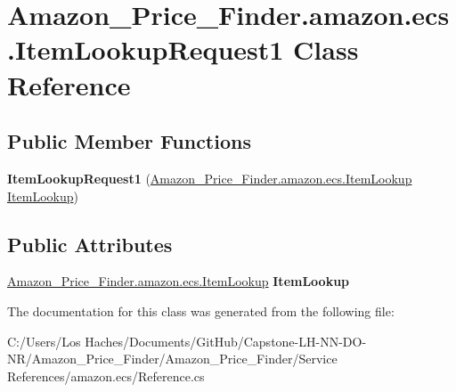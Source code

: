 \hypertarget{class_amazon___price___finder_1_1amazon_1_1ecs_1_1_item_lookup_request1}{\section{Amazon\-\_\-\-Price\-\_\-\-Finder.\-amazon.\-ecs.\-Item\-Lookup\-Request1 Class Reference}
\label{class_amazon___price___finder_1_1amazon_1_1ecs_1_1_item_lookup_request1}
}
\subsection*{Public Member Functions}
\begin{DoxyCompactItemize}
\item 
\hypertarget{class_amazon___price___finder_1_1amazon_1_1ecs_1_1_item_lookup_request1_a69e55354d7ee6fc281528b6348fb26d5}{{\bfseries Item\-Lookup\-Request1} (\hyperlink{class_amazon___price___finder_1_1amazon_1_1ecs_1_1_item_lookup}{Amazon\-\_\-\-Price\-\_\-\-Finder.\-amazon.\-ecs.\-Item\-Lookup} \hyperlink{class_amazon___price___finder_1_1amazon_1_1ecs_1_1_item_lookup}{Item\-Lookup})}\label{class_amazon___price___finder_1_1amazon_1_1ecs_1_1_item_lookup_request1_a69e55354d7ee6fc281528b6348fb26d5}

\end{DoxyCompactItemize}
\subsection*{Public Attributes}
\begin{DoxyCompactItemize}
\item 
\hypertarget{class_amazon___price___finder_1_1amazon_1_1ecs_1_1_item_lookup_request1_aa6a2d22c297c09a6fcc441c3098e3f32}{\hyperlink{class_amazon___price___finder_1_1amazon_1_1ecs_1_1_item_lookup}{Amazon\-\_\-\-Price\-\_\-\-Finder.\-amazon.\-ecs.\-Item\-Lookup} {\bfseries Item\-Lookup}}\label{class_amazon___price___finder_1_1amazon_1_1ecs_1_1_item_lookup_request1_aa6a2d22c297c09a6fcc441c3098e3f32}

\end{DoxyCompactItemize}


The documentation for this class was generated from the following file\-:\begin{DoxyCompactItemize}
\item 
C\-:/\-Users/\-Los Haches/\-Documents/\-Git\-Hub/\-Capstone-\/\-L\-H-\/\-N\-N-\/\-D\-O-\/\-N\-R/\-Amazon\-\_\-\-Price\-\_\-\-Finder/\-Amazon\-\_\-\-Price\-\_\-\-Finder/\-Service References/amazon.\-ecs/Reference.\-cs\end{DoxyCompactItemize}
